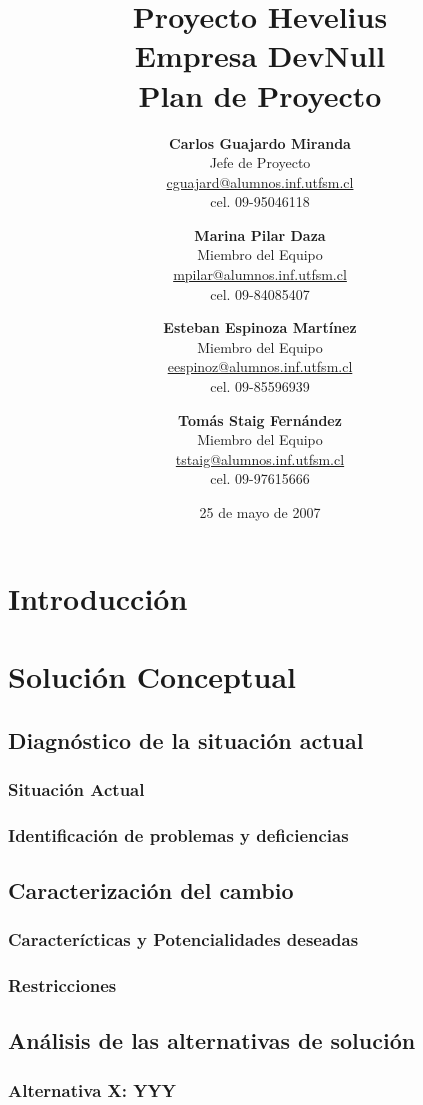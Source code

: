\documentclass[letterpaper,spanish,10pt]{article}
\title{{\Huge \bf Proyecto Hevelius} \\ {\Large Empresa DevNull} \\ {\small Plan de Proyecto}}
\author{
{\bf Carlos Guajardo Miranda} \\ Jefe de Proyecto \\ \url{cguajard@alumnos.inf.utfsm.cl} \\ cel. 09-95046118 
\and
{\bf Marina Pilar Daza} \\ Miembro del Equipo \\ \url{mpilar@alumnos.inf.utfsm.cl} \\ cel. 09-84085407
\and
{\bf Esteban Espinoza Mart\'inez} \\ Miembro del Equipo \\ \url{eespinoz@alumnos.inf.utfsm.cl} \\ cel. 09-85596939
\and
{\bf Tom\'as Staig Fern\'andez} \\ Miembro del Equipo \\ \url{tstaig@alumnos.inf.utfsm.cl} \\ cel. 09-97615666
}
\date{25 de mayo de 2007}
\begin{document}
\maketitle


%
%
\newpage

\section{Introducci\'on} %



\section{Soluci\'on Conceptual} %
\subsection{Diagn\'ostico de la situaci\'on actual}
\subsubsection{Situaci\'on Actual}



\subsubsection{Identificaci\'on de problemas y deficiencias}



\subsection{Caracterizaci\'on del cambio}
\subsubsection{Caracter\'icticas y Potencialidades deseadas}



\subsubsection{Restricciones}



\subsection{An\'alisis de las alternativas de soluci\'on}
\subsubsection{Alternativa X: YYY}
\end{document}
